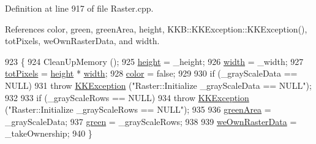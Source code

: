 Definition at line 917 of file Raster.\+cpp.



References color, green, green\+Area, height, K\+K\+B\+::\+K\+K\+Exception\+::\+K\+K\+Exception(), tot\+Pixels, we\+Own\+Raster\+Data, and width.


\begin{DoxyCode}
923 \{
924   CleanUpMemory ();
925   \hyperlink{class_k_k_b_1_1_raster_af39ff189de4fbb6de98392e187efafb7}{height} = \_height;
926   \hyperlink{class_k_k_b_1_1_raster_ae0bcc103e191c3421d7692dc69ceb554}{width}  = \_width;
927   \hyperlink{class_k_k_b_1_1_raster_a9b08c4a0ca0a35435a478599635f1dc0}{totPixels} = \hyperlink{class_k_k_b_1_1_raster_af39ff189de4fbb6de98392e187efafb7}{height} * \hyperlink{class_k_k_b_1_1_raster_ae0bcc103e191c3421d7692dc69ceb554}{width};
928   \hyperlink{class_k_k_b_1_1_raster_a482384d89cc53fa4f36276307c746854}{color} = \textcolor{keyword}{false};
929 
930   \textcolor{keywordflow}{if}  (\_grayScaleData == NULL)
931     \textcolor{keywordflow}{throw} \hyperlink{class_k_k_b_1_1_k_k_exception}{KKException} (\textcolor{stringliteral}{"Raster::Initialize    \_grayScaleData == NULL"});
932 
933   \textcolor{keywordflow}{if}  (\_grayScaleRows == NULL)
934     \textcolor{keywordflow}{throw} \hyperlink{class_k_k_b_1_1_k_k_exception}{KKException} (\textcolor{stringliteral}{"Raster::Initialize    \_grayScaleRows == NULL"});
935 
936   \hyperlink{class_k_k_b_1_1_raster_ad981258f1f7284a8bd0cd0466f328cdf}{greenArea} = \_grayScaleData;
937   \hyperlink{class_k_k_b_1_1_raster_a2d2238911145488e226cd2e34fc8448c}{green} = \_grayScaleRows;
938 
939   \hyperlink{class_k_k_b_1_1_raster_a3f960c2c781707efa7942d4fd2065e52}{weOwnRasterData} = \_takeOwnership;
940 \}
\end{DoxyCode}
